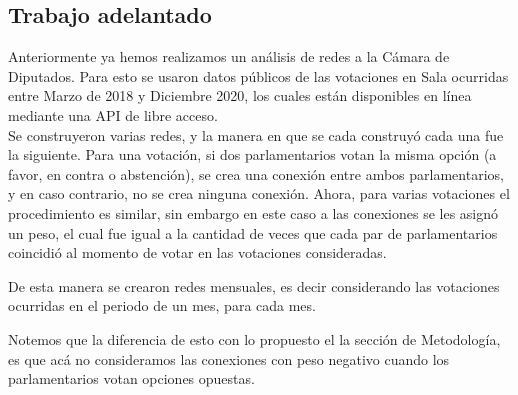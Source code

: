 \documentclass{proyectotesis}
\begin{document}
\subsection{Trabajo adelantado}
Anteriormente ya hemos realizamos un análisis de redes a la Cámara de Diputados. Para esto se usaron datos públicos de las votaciones en Sala ocurridas entre Marzo de 2018 y Diciembre 2020, los cuales están disponibles en línea mediante una API de libre acceso.\\ 

Se construyeron varias redes, y la manera en que se cada construyó cada  una fue la siguiente. Para una votación, si dos parlamentarios votan la misma opción (a favor, en contra o  abstención), se crea una conexión entre ambos parlamentarios, y en caso contrario, no se crea ninguna conexión. Ahora, para varias votaciones el procedimiento es similar, sin embargo en este caso a las conexiones se les asignó un peso, el cual fue igual a la cantidad de veces que cada par de parlamentarios coincidió al momento de votar en las votaciones consideradas.

De esta manera se crearon redes mensuales, es decir considerando las votaciones ocurridas en el periodo de un mes, para cada mes.

Notemos que la diferencia de esto con lo propuesto el la sección de Metodología, es que acá no consideramos las conexiones con peso negativo cuando los parlamentarios votan opciones opuestas.\\
\end{document}
